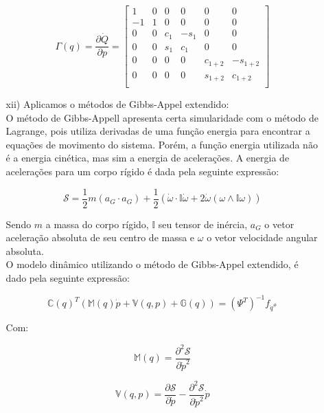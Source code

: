 \documentclass[12pt,a4paper]{article}
\begin{document}
\begin{itemize}
\begin{itemize}
	\begin{equation}
	\Gamma(q) = \frac{\partial \dot{Q}}{\partial p} =
	\begin{bmatrix}
	1 & 0 & 0 & 0 & 0 & 0 \\
	-1 & 1 & 0 & 0 & 0 & 0 \\
	0 & 0 & c_1 & -s_1 & 0 & 0 \\
	0 & 0 & s_1 & c_1 & 0 & 0 \\
	0 & 0 & 0 & 0 & c_{1+2} & -s_{1+2} \\
	0 & 0 & 0 & 0 & s_{1+2} & c_{1+2} \\
	\end{bmatrix}
	\end{equation}

	\item[xii)] Aplicamos o métodos de Gibbs-Appel extendido: \\
	
	O método de Gibbs-Appell apresenta certa simularidade com o método de Lagrange, pois utiliza derivadas de uma função energia para encontrar a equações de movimento do sistema. Porém, a função energia utilizada não é a energia cinética, mas sim a energia de acelerações. A energia de acelerações para um corpo rígido é dada pela seguinte expressão:

	$$ \mathcal{S} = \frac{1}{2} m ( a_G \cdot a_G ) + \frac{1}{2}( \dot{\omega} \cdot \mathbb{I} \dot{\omega} + 2 \dot{\omega} (\omega \wedge 	\mathbb{I} \omega )  )  $$
 
	Sendo $m$ a massa do corpo rígido, $\mathbb{I}$ seu tensor de inércia, $a_G$ o vetor aceleração absoluta de seu centro de massa e $\omega$ o vetor velocidade angular absoluta.  \\

	O modelo dinâmico utilizando o método de Gibbs-Appel extendido, é dado pela seguinte expressão:
	
	\begin{equation}
	\mathbb{C}(q)^T ( \mathbb{M}(q) \dot{p} + \mathbb{V}(q,p) + \mathbb{G}(q)) = (\Psi^T)^{-1} f_{\dot{q}^{\#}} 
	\end{equation}
	
	Com:
	
	\begin{equation}
	\mathbb{M}(q) = \frac{\partial^2 \mathcal{S}}{\partial \dot{p}^2}
	\end{equation}
	
	\begin{equation}
	\mathbb{V}(q,p) =  \frac{\partial \mathcal{S}}{\partial \dot{p}} - \frac{\partial^2 \mathcal{S}}{\partial \dot{p}^2} \dot{p}
	\end{equation}
	

\end{itemize}
\end{itemize}
\end{document}
